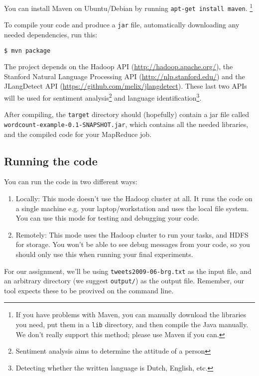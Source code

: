 \documentclass[a4paper,11pt]{article}
\begin{document}
  You can install Maven on Ubuntu/Debian by running \texttt{apt-get install maven}.
  \footnote{If you have problems with Maven, you can manually download the libraries you need, put them in a \texttt{lib} directory, and then compile
  the Java manually. We don't really support this method; please use Maven if you can.}

  To compile your code and produce a \texttt{jar} file, automatically downloading any needed dependencies, run this:
\begin{lstlisting}
$ mvn package
\end{lstlisting}

  The project depends on the Hadoop API (\url{http://hadoop.apache.org/}), the Stanford Natural Language Processing API (\url{http://nlp.stanford.edu/}) and the JLangDetect API (\url{https://github.com/melix/jlangdetect}). These last two APIs will be used for sentiment analysis\footnote{Sentiment analysis aims to determine the attitude of a person} and language identification\footnote{Detecting whether the written language is Dutch, English, etc. }.

  After compiling, the \texttt{target} directory should (hopefully) contain a jar file called\\ \texttt{wordcount-example-0.1-SNAPSHOT.jar}, which contains
  all the needed libraries, and the compiled code for your MapReduce job.

   \subsection{Running the code}

  You can run the code in two different ways:

  \begin{enumerate}
    \item Locally: This mode doesn't use the Hadoop cluster at all. It runs the code on a single machine e.g. your laptop/workstation and uses the local file system. You can use this mode for testing and debugging your code.
    \item Remotely: This mode uses the Hadoop cluster to run your tasks, and HDFS for storage. You won't be able to see debug messages from your code, so you should only use this when running your final experiments.
  \end{enumerate}

For our assignment, we'll be using \texttt{tweets2009-06-brg.txt} as the input
file, and an arbitrary directory (we suggest \texttt{output/}) as the output file. Remember, our tool
expects these to be provived on the command line.
\end{document}
